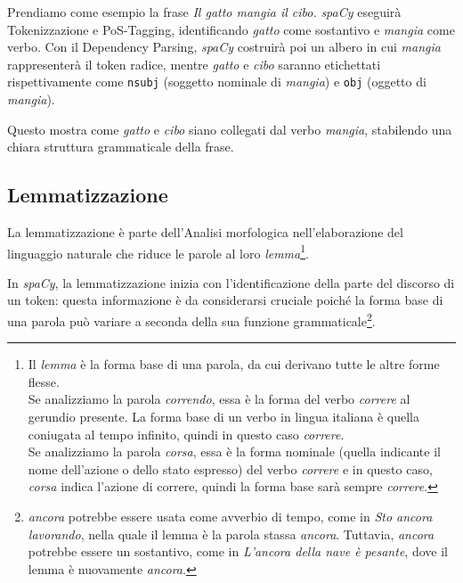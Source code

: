 \documentclass[12pt]{report}
\newcommand{\spacy}{\textsl{spaCy}\xspace}
\begin{document}
\begin{mdframed}
\small
Prendiamo come esempio la frase \textit{Il gatto mangia il cibo.} \spacy eseguirà Tokenizzazione e PoS-Tagging, identificando \textit{gatto} come sostantivo e \textit{mangia} come verbo. Con il Dependency Parsing, \spacy costruirà poi un albero in cui \textit{mangia} rappresenterà il token radice, mentre \textit{gatto} e \textit{cibo} saranno etichettati rispettivamente come \texttt{nsubj} (soggetto nominale di \textit{mangia}) e \texttt{obj} (oggetto di \textit{mangia}).

Questo mostra come \textit{gatto} e \textit{cibo} siano collegati dal verbo \textit{mangia}, stabilendo una chiara struttura grammaticale della frase.
\end{mdframed}


\subsection{Lemmatizzazione}
La lemmatizzazione è parte dell'\textsf{Analisi morfologica} nell'elaborazione del linguaggio naturale che riduce le parole al loro \textit{lemma}\footnote{Il \textit{lemma} è la forma base di una parola, da cui derivano tutte le altre forme flesse.\\
Se analizziamo la parola \textit{correndo}, essa è la forma del verbo \textit{correre} al gerundio presente. La forma base di un verbo in lingua italiana è quella coniugata al tempo infinito, quindi in questo caso \textit{correre}.\\
Se analizziamo la parola \textit{corsa}, essa è la forma nominale (quella indicante il nome dell'azione o dello stato espresso) del verbo \textit{correre} e in questo caso, \textit{corsa} indica l'azione di correre, quindi la forma base sarà sempre \textit{correre}.\label{fn:lemma}}.

In \spacy, la lemmatizzazione inizia con l'identificazione della parte del discorso di un token: questa informazione è da considerarsi cruciale poiché la forma base di una parola può variare a seconda della sua funzione grammaticale\footnote{\textit{ancora} potrebbe essere usata come avverbio di tempo, come in \textit{Sto ancora lavorando}, nella quale il lemma è la parola stassa \textit{ancora}. Tuttavia, \textit{ancora} potrebbe essere un sostantivo, come in \textit{L'ancora della nave è pesante}, dove il lemma è nuovamente \textit{ancora}.}.
\end{document}
